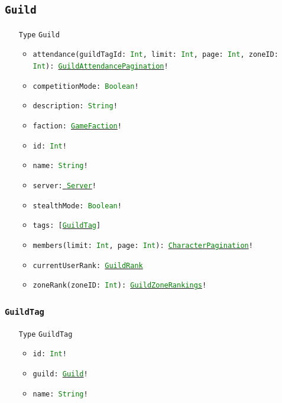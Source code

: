 \documentclass[10pt, a4paper]{memoir}
\numberwithin{equation}{section}
\theoremstyle{plain}
\theoremstyle{defp}
\theoremstyle{dotless}
\theoremstyle{definition}
\theoremstyle{dotless}
\theoremstyle{dotless}
\theoremstyle{defp}
\theoremstyle{defp}
\theoremstyle{be}          %
\theoremstyle{defp}
\newcommand\ttt[1]{\texttt{#1}}
\newcommand\type[1]{\ttt{\textcolor{green}{#1}}}
\begin{document}
\subsection{\ttt{Guild}}\label{sec:Guild}

\begin{itemize}[noitemsep,topsep=1pt]
	\item[\ttt{Type}] \ttt{Guild}
	\begin{itemize}[itemsep=1pt,topsep=1pt]
		\item \ttt{attendance(guildTagId: \type{Int}, limit: \type{Int}, page: \type{Int}, zoneID: \type{Int}): \hyperref[sec:guildattendancepagination]{\type{GuildAttendancePagination}}!}
		\item \ttt{competitionMode: \type{Boolean}!}
		\item \ttt{description: \type{String}!}
		\item \ttt{faction: \hyperref[sec:GameFaction]{\type{GameFaction}}!}
		\item \ttt{id: \type{Int}!}
		\item \ttt{name: \type{String}!}
		\item \ttt{server:\hyperref[sec:Server]{ \type{Server}}!}
		\item \ttt{stealthMode: \type{Boolean}!}
		\item \ttt{tags: [\hyperref[sec:GuildTag]{\type{GuildTag}}]}
		\item \ttt{members(limit: \type{Int}, page: \type{Int}): \hyperref[sec:characterpagination]{\type{CharacterPagination}}!}
		\item \ttt{currentUserRank: \hyperref[sec:GuildRank]{\type{GuildRank}}}
		\item \ttt{zoneRank(zoneID: \type{Int}): \hyperref[sec:GuildZoneRankings]{\type{GuildZoneRankings}}!}
	\end{itemize}
\end{itemize}

\subsubsection{\ttt{GuildTag}}\label{sec:GuildTag}

\begin{itemize}[noitemsep,topsep=1pt]
\item[\ttt{Type}] \ttt{GuildTag}
\begin{itemize}[itemsep=1pt,topsep=1pt]
\item \ttt{id: \type{Int}!}
\item \ttt{guild: \hyperref[sec:Guild]{\type{Guild}}!}
\item \ttt{name: \type{String}!}
\end{itemize}
\end{itemize}
\end{document}
